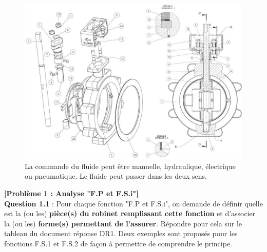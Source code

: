 \documentclass[
	11pt, %
	fleqn, %
	a4paper, %
]{LegrandOrangeBook}
\begin{document}
\begin{figure}[H] %
	\centering %
	\includegraphics[width=1.1\textwidth]{Images/rob11.JPG} %
	\caption{La commande du fluide peut être manuelle, hydraulique, électrique ou pneumatique. Le fluide peut passer dans les deux sens.}
	\label{rob11} %
\end{figure}


\begin{tcolorbox}[colback=gray!5!white,colframe=gray!75!ocre,title=Tiré du BTS 2015]
\textbf{[Problème 1 : Analyse "F.P et F.S.i"]}\\


\textbf{Question 1.1 }: Pour chaque fonction "F.P et F.S.i", on demande de définir quelle est la (ou les)
\textbf{pièce(s) du robinet remplissant cette fonction} et d'associer la (ou les) \textbf{forme(s) permettant de l'assurer}. Répondre pour cela sur le tableau du document réponse DR1. Deux exemples sont proposés pour les fonctions F.S.1 et F.S.2 de façon à permettre de comprendre le principe. \\

\end{tcolorbox}
\end{document}
